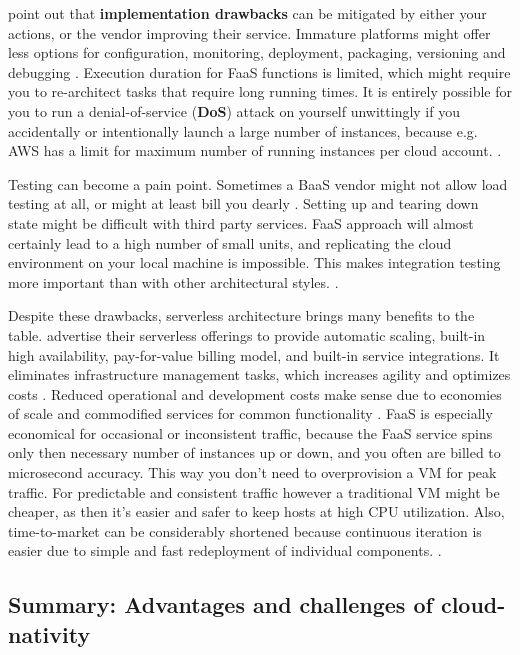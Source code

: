 \documentclass[utf8,english]{gradu3}
\begin{document}
\textcite{Roberts2018} point out that \textbf{implementation drawbacks} can be
mitigated by either your actions, or the vendor improving their service.
Immature platforms might offer less options for configuration, monitoring,
deployment, packaging, versioning and debugging \parencite{Roberts2018}.
Execution duration for FaaS functions is limited, which might require you to
re-architect tasks that require long running times. It is entirely possible for
you to run a denial-of-service (\textbf{DoS}) attack on yourself unwittingly if
you accidentally or intentionally launch a large number of instances, because
e.g.  AWS has a limit for maximum number of running instances per cloud account.
\parencite{Roberts2018}.

Testing can become a pain point. Sometimes a BaaS vendor might not allow load
testing at all, or might at least bill you dearly \parencite{Roberts2018}.
Setting up and tearing down state might be difficult with third party services.
FaaS approach will almost certainly lead to a high number of small units, and
replicating the cloud environment on your local machine is impossible. This
makes integration testing more important than with other architectural styles.
\parencite{Roberts2018}.

Despite these drawbacks, serverless architecture brings many benefits to the
table. \textcite{AWS-serverless} advertise their serverless offerings to provide
automatic scaling, built-in high availability, pay-for-value billing model, and
built-in service integrations. It eliminates infrastructure management tasks,
which increases agility and optimizes costs \parencite{AWS-serverless}. Reduced
operational and development costs make sense due to economies of scale and
commodified services for common functionality \parencite{Roberts2018}. FaaS is
especially economical for occasional or inconsistent traffic, because the FaaS
service spins only then necessary number of instances up or down, and you often
are billed to microsecond accuracy. This way you don't need to overprovision a
VM for peak traffic. For predictable and consistent traffic however a
traditional VM might be cheaper, as then it's easier and safer to keep hosts at
high CPU utilization. Also, time-to-market can be considerably shortened because
continuous iteration is easier due to simple and fast redeployment of individual
components. \parencite{Roberts2018}.


\subsection{Summary: Advantages and challenges of cloud-nativity}
\end{document}
